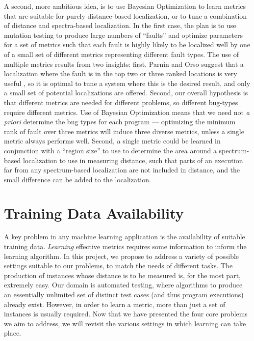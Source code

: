 A second, more ambitious idea, is to use Bayesian Optimization to
learn metrics that are suitable for purely distance-based
localization, or to tune a combination of distance and spectra-based
localization.  In the first case, the plan is to use mutation testing
to produce large numbers of ``faults'' and optimize parameters for a
set of metrics such that each fault is highly likely to be localized
well by one of a small set of different metrics representing different
fault types.  The use of multiple metrics results from two insights:
first, Parnin and Orso suggest that a localization where the fault is
in the top two or three ranked locations is very useful
\cite{AutoHelp}, so it is optimal to tune a system where this is the
desired result, and only a small set of potential localizations are
offered.  Second, our overall hypothesis is that different metrics are
needed for different problems, so different bug-types require
different metrics.  Use of Bayesian Optimization means that we need
not \emph{a priori} determine the bug types for each program ---
optimizing the minimum rank of fault over three metrics will induce
three diverse metrics, unless a single metric always performs well.
Second, a single metric could be learned in conjunction with a
``region size'' to use to determine the area around a spectrum-based
localization to use in measuring distance, such that parts of an
execution far from any spectrum-based localization are not included in
distance, and the small difference can be added to the localization.

\section{Training Data Availability}

A key problem in any machine learning application is the availability
of suitable training data.  \emph{Learning} effective metrics requires
some information to inform the learning algorithm.  In this project,
we propose to address a variety of possible settings suitable to our
problems, to match the needs of different tasks.  The production of
instances whose distance is to be measured is, for the most part,
extremely easy.  Our domain is automated testing, where algorithms to
produce an essentially unlimited set of distinct test cases (and thus
program executions) already exist.  However, in order to learn a
metric, more than just a set of instances is usually required.  Now
that we have presented the four core problems we aim to address, we
will revisit the various settings in which learning can take place.

